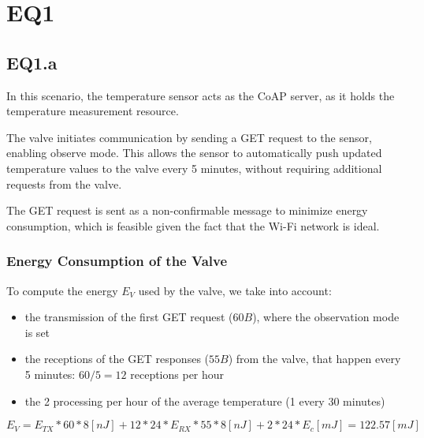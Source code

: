 \documentclass{Configuration_Files/PoliMi3i_thesis}
\begin{document}
\mainmatter %


\cleardoublepage

\chapter{EQ1}

\section{EQ1.a}
In this scenario, the temperature sensor acts as the CoAP server, as it holds the temperature measurement resource.

The valve initiates communication by sending a GET request to the sensor, enabling observe mode. This allows the sensor to automatically push updated temperature values to the valve every 5 minutes, without requiring additional requests from the valve.

The GET request is sent as a non-confirmable message to minimize energy consumption, which is feasible given the fact that the Wi-Fi network is ideal.

\subsection{Energy Consumption of the Valve}
To compute the energy $E_V$ used by the valve, we take into account:
\begin{itemize}
    \item the transmission of the first GET request ($60B$), where the observation mode is set
    \item the receptions of the GET responses ($55B$) from the valve, that happen every 5 minutes: $60/5=12$ receptions per hour
    \item the 2 processing per hour of the average temperature (1 every 30 minutes)
\end{itemize}

\begin{equation}
    E_{V} = E_{TX}*60*8  [nJ] + 12*24*E_{RX}*55*8  [nJ] + 2*24*E_c [mJ] = 122.57 [mJ]
\end{equation}
\end{document}
